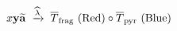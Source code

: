 \documentclass[preview]{standalone}
\begin{document}
\begin{align*}
\special{dvisvgm:raw <g id='unique000'>}x\mathbf{y}\widetilde{\mathbf{a}} \;\xrightarrow{\widehat{\lambda}}\; \overline{T}_{\text{frag}}\text{ (Red)} \circ \overline{T}_{\text{pyr}}\text{ (Blue)}\special{dvisvgm:raw </g>}
\end{align*}
\end{document}
